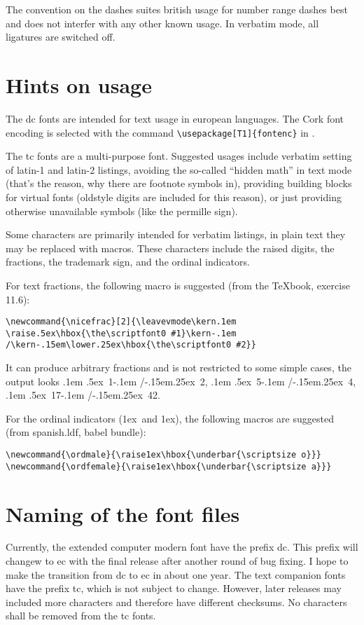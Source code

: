 \documentclass{article}
\renewcommand{\-}{\discretionary{\char'0177 }{}{}}
\newcommand{\nicefrac}[2]{\leavevmode\kern.1em
\raise.5ex\hbox{\the\scriptfont0 #1}\kern-.1em
/\kern-.15em\lower.25ex\hbox{\the\scriptfont0 #2}}
\newcommand{\ordmale}{\raise1ex\hbox{\underbar{\scriptsize o}}}
\newcommand{\ordfemale}{\raise1ex\hbox{\underbar{\scriptsize a}}}
\begin{document}
The convention on the dashes suites british usage for number range dashes 
best and does not interfer with any other known usage. In verbatim mode,
all ligatures are switched off.

\section{Hints on usage}

The \textsf{dc} fonts are intended for text usage in european languages. 
The Cork font encoding is selected with the command 
\verb:\usepackage[T1]{fontenc}: in \LaTeXe.

The \textsf{tc} fonts are a multi-purpose font. Suggested usages include
verbatim setting of latin-1 and latin-2 listings, avoiding the so-called 
``hidden math'' in text mode (that's the reason, why there are footnote 
symbols in), providing building blocks for virtual fonts (oldstyle digits
are included for this reason), or just providing otherwise unavailable 
symbols (like the permille sign).

Some characters are primarily intended for verbatim listings, in plain text
they may be replaced with macros. These characters include the raised digits, 
the fractions, the trademark sign, and the ordinal indicators.

For text fractions, the following macro is suggested (from the \TeX book,
exercise 11.6):
\begin{verbatim}
\newcommand{\nicefrac}[2]{\leavevmode\kern.1em
\raise.5ex\hbox{\the\scriptfont0 #1}\kern-.1em
/\kern-.15em\lower.25ex\hbox{\the\scriptfont0 #2}}
\end{verbatim}
It can produce arbitrary fractions and is not restricted to some simple 
cases, the output looks \nicefrac12, \nicefrac54, \nicefrac{17}{42}.

For the ordinal indicators (\ordmale\ and \ordfemale), 
the following macros are suggested (from 
spanish.ldf, \textsf{babel} bundle):
\begin{verbatim}
\newcommand{\ordmale}{\raise1ex\hbox{\underbar{\scriptsize o}}}
\newcommand{\ordfemale}{\raise1ex\hbox{\underbar{\scriptsize a}}}
\end{verbatim}

\section{Naming of the font files}
Currently, the extended computer modern font have the prefix \textsf{dc}.
This prefix will changew to \textsf{ec} with the final release after 
another round of bug fixing. I hope to make the transition from \textsf{dc} 
to \textsf{ec} in about one year. The text companion fonts have the prefix 
\textsf{tc}, which is not subject to change. However, later releases may 
included more characters and therefore have different checksums. No 
characters shall be removed from the \textsf{tc} fonts.
\end{document}
